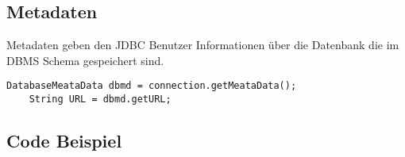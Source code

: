 \subsection{Metadaten}
Metadaten geben den JDBC Benutzer Informationen über die Datenbank die im DBMS Schema gespeichert sind.
\begin{lstlisting}[style=Java]
    DatabaseMeataData dbmd = connection.getMeataData();
    String URL = dbmd.getURL;
\end{lstlisting}

\subsection{Code Beispiel}



